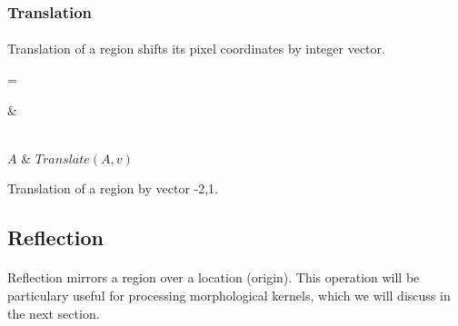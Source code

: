 \subsubsection{Translation}

\paragraph*{}
Translation of a region shifts its pixel coordinates by integer vector.

\newarray\translationInput
{}

\newarray\translationResult
{}

\dataheight=\gridwidth

\begin{table}[h!]
\centering
{}

 &

\\

$A$ &
$Translate(A, v)$

\endtabular
\caption{Translation of a region by vector -2,1.}
\label{tab:RegionTranslation}
\end{table}

\subsection{Reflection}

\paragraph*{}
Reflection mirrors a region over a location (origin). This operation will be particulary useful for processing morphological kernels, which we will discuss in the next section.

\newarray{}
{}


